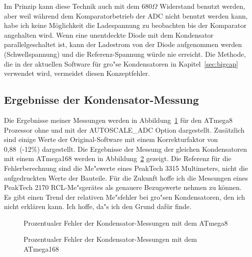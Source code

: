 Im Prinzip kann diese Technik auch mit dem \(680\Omega\) Widerstand benutzt werden,
aber weil w\"ahrend dem Komparatorbetrieb der ADC nicht benutzt werden kann, habe ich keine
M\"oglichkeit die Ladespannung zu beobachten bis der Komparator angehalten wird.
Wenn eine unentdeckte Diode mit dem Kondensator parallelgeschaltet ist, kann der Ladestrom
von der Diode aufgenommen werden (Schwellspannung) und die Referenz-Spannung w\"urde nie erreicht.
Die Methode, die in der aktuellen Software f\"ur gro"se Kondensatoren in Kapitel~\ref{sec:bigcap}
verwendet wird, vermeidet diesen Konzeptfehler.

\subsection{Ergebnisse der Kondensator-Messung}
Die Ergebnisse meiner Messungen werden in Abbildung~\ref{fig:mega8cap} f\"ur den ATmega8 Prozessor ohne und mit
der AUTOSCALE\_ADC Option dargestellt. Zus\"atzlich sind einige Werte der Original-Software mit einem Korrekturfaktor
von 0,88~(-12\%) dargestellt.
Die Ergebnisse der Messung der gleichen Kondensatoren mit einem ATmega168 werden in Abbildung~\ref{fig:mega168cap} gezeigt.
Die Referenz f\"ur die Fehlerberechnung sind die Me"swerte eines PeakTech 3315 Multimeters, nicht die aufgedruckten
Werte der Bauteile. F\"ur die Zukunft hoffe ich die Messungen eines PeakTech 2170 RCL-Me"sger\"ates als genauere
Bezugswerte nehmen zu k\"onnen.
Es gibt einen Trend der relativen Me"sfehler bei gro"sen Kondensatoren, den ich nicht erkl\"aren kann.
Ich hoffe, da"s ich den Grund daf\"ur finde.

\begin{figure}[H]
\centering

\caption{Prozentualer Fehler der Kondensator-Messungen mit dem ATmega8}
\label{fig:mega8cap}
\end{figure}

\begin{figure}[H]
\centering

\caption{Prozentualer Fehler der Kondensator-Messungen mit dem ATmega168}
\label{fig:mega168cap}
\end{figure}

